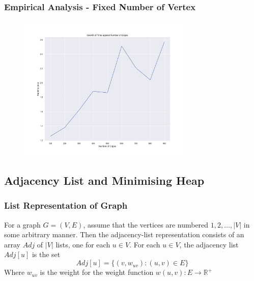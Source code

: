 \documentclass{beamer}
\begin{document}
\begin{frame}
	\frametitle{Empirical Analysis - Fixed Number of Vertex}
	\begin{figure}
		\centering
		\includegraphics[width=0.75\textwidth]{pict/Q1_fixedVertex.png}
	\end{figure}
\end{frame}

\subsection{Adjacency List and Minimising Heap}
\begin{frame}
	\frametitle{List Representation of Graph}	
	For a graph \( G = (V, E) \), assume that the vertices are numbered \( 1, 2, \hdots, \lvert{ V }\rvert  \) in some arbitrary manner. Then the adjacency-list representation consists of an array \( Adj \) of \( \lvert{ V }\rvert  \) lists, one for each \( u \in V \). For each \( u \in V\), the adjacency list \( Adj[u] \) is the set
	\[
		Adj[u] = \{ (v, w_{uv}) : (u, v) \in E\}
	\]
	Where \( w_{uv} \) is the weight for the weight function \( w(u, v) : E \rightarrow \mathbb{R}^+ \) 
\end{frame}
\end{document}
